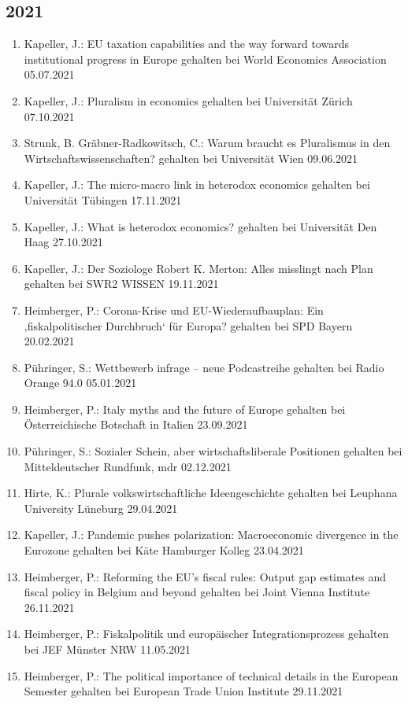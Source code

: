 \subsection*{2021}
\begin{enumerate}
	\item Kapeller, J.: EU taxation capabilities and the way forward towards institutional progress in Europe gehalten bei World Economics Association 05.07.2021
	\item Kapeller, J.: Pluralism in economics gehalten bei Universität Zürich 07.10.2021
	\item Strunk, B. Gräbner-Radkowitsch, C.: Warum braucht es Pluralismus in den Wirtschaftswissenschaften? gehalten bei Universität Wien 09.06.2021
	\item Kapeller, J.: The micro-macro link in heterodox economics gehalten bei Universität Tübingen 17.11.2021
	\item Kapeller, J.: What is heterodox economics? gehalten bei Universität Den Haag 27.10.2021
	\item Kapeller, J.: Der Soziologe Robert K. Merton: Alles misslingt nach Plan gehalten bei SWR2 WISSEN 19.11.2021
	\item Heimberger, P.: Corona-Krise und EU-Wiederaufbauplan: Ein ‚fiskalpolitischer Durchbruch‘ für Europa? gehalten bei SPD Bayern 20.02.2021
	\item Pühringer, S.: Wettbewerb infrage -- neue Podcastreihe gehalten bei Radio Orange 94.0 05.01.2021
	\item Heimberger, P.: Italy myths and the future of Europe gehalten bei Österreichische Botschaft in Italien 23.09.2021
	\item Pühringer, S.: Sozialer Schein, aber wirtschaftsliberale Positionen gehalten bei Mitteldeutscher Rundfunk, mdr 02.12.2021
	\item Hirte, K.: Plurale volkswirtschaftliche Ideengeschichte gehalten bei Leuphana University Lüneburg 29.04.2021
	\item Kapeller, J.: Pandemic pushes polarization: Macroeconomic divergence in the Eurozone gehalten bei Käte Hamburger Kolleg 23.04.2021
	\item Heimberger, P.: Reforming the EU’s fiscal rules: Output gap estimates and fiscal policy in Belgium and beyond gehalten bei Joint Vienna Institute 26.11.2021
	\item Heimberger, P.: Fiskalpolitik und europäischer Integrationsprozess gehalten bei JEF Münster NRW 11.05.2021
	\item Heimberger, P.: The political importance of technical details in the European Semester gehalten bei European Trade Union Institute 29.11.2021

\end{enumerate}
